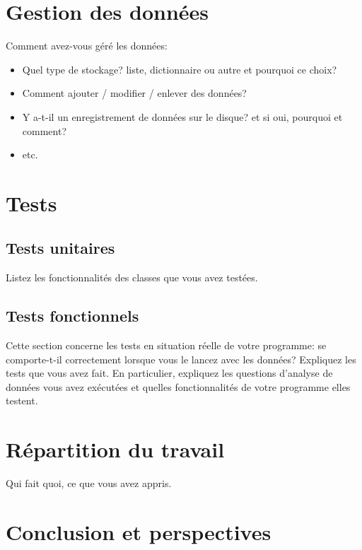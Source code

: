 \documentclass[11pt,a4paper]{article}
\begin{document}
\section{Gestion des données}

Comment avez-vous géré les données: 
\begin{itemize}
    \item Quel type de stockage? liste, dictionnaire ou autre et pourquoi ce choix?
    \item Comment ajouter / modifier / enlever des données?
    \item Y a-t-il un enregistrement de données sur le disque? et si oui, pourquoi et comment?
    \item etc.
\end{itemize}

\section{Tests}

\subsection{Tests unitaires}

Listez les fonctionnalités des classes que vous avez testées.

\subsection{Tests fonctionnels}

Cette section concerne les tests en situation réelle de votre programme: se comporte-t-il correctement lorsque vous le lancez avec les données?
Expliquez les tests que vous avez fait.
En particulier, expliquez les questions d'analyse de données vous avez exécutées et quelles fonctionnalités de votre programme elles testent.

% 

\section{Répartition du travail}

Qui fait quoi, ce que vous avez appris.

\section{Conclusion et perspectives}
\end{document}
